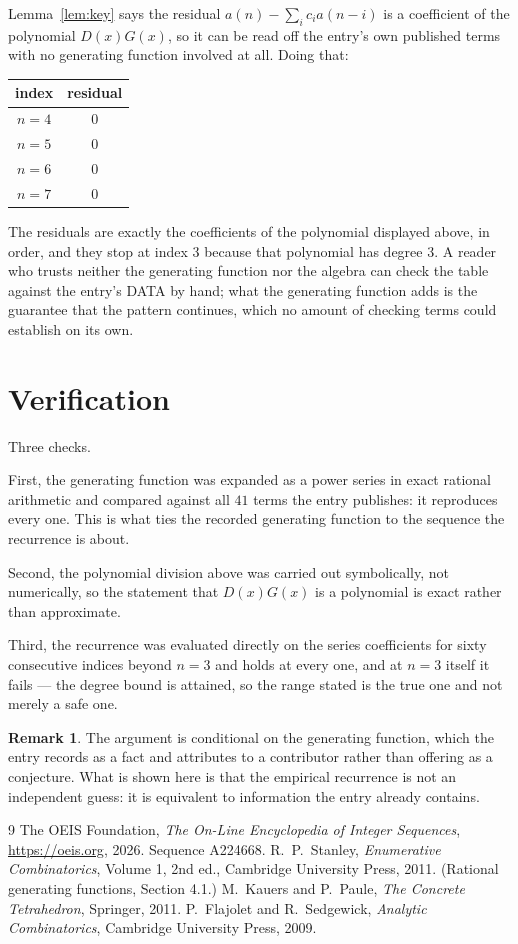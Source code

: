 \documentclass[11pt,a4paper]{article}
\theoremstyle{plain}
\theoremstyle{definition}
\newtheorem{remark}[theorem]{Remark}
\begin{document}
Lemma~\ref{lem:key} says the residual $a(n)-\sum_ic_ia(n-i)$ is a coefficient of the
polynomial $D(x)G(x)$, so it can be read off the entry's own published terms with no
generating function involved at all. Doing that:
\begin{center}
\begin{tabular}{cc}
index & residual \\ \hline
$n=4$ & $0$ \\
$n=5$ & $0$ \\
$n=6$ & $0$ \\
$n=7$ & $0$
\end{tabular}
\end{center}
The residuals are exactly the coefficients of the polynomial displayed above, in order, and
they stop at index $3$ because that polynomial has degree $3$. A reader who trusts
neither the generating function nor the algebra can check the table against the entry's DATA
by hand; what the generating function adds is the guarantee that the pattern continues, which
no amount of checking terms could establish on its own.

\section{Verification}

Three checks.

First, the generating function was expanded as a power series in exact rational arithmetic and
compared against all $41$ terms the entry publishes: it reproduces every one. This is
what ties the recorded generating function to the sequence the recurrence is about.

Second, the polynomial division above was carried out symbolically, not numerically, so the
statement that $D(x)G(x)$ is a polynomial is exact rather than approximate.

Third, the recurrence was evaluated directly on the series coefficients for sixty consecutive
indices beyond $n=3$ and holds at every one, and at $n=3$ itself it fails --- the
degree bound is attained, so the range stated is the true one and not merely a safe one.

\begin{remark}
The argument is conditional on the generating function, which the entry records as a fact and
attributes to a contributor rather than offering as a conjecture. What is shown here is that
the empirical recurrence is not an independent guess: it is equivalent to information the
entry already contains.
\end{remark}

\begin{thebibliography}{9}
 The OEIS Foundation, \emph{The On-Line Encyclopedia of Integer
Sequences}, \url{https://oeis.org}, 2026. Sequence A224668.
 R.~P.~Stanley, \emph{Enumerative Combinatorics}, Volume 1, 2nd ed.,
Cambridge University Press, 2011. (Rational generating functions, Section 4.1.)
 M.~Kauers and P.~Paule, \emph{The Concrete Tetrahedron}, Springer, 2011.
 P.~Flajolet and R.~Sedgewick, \emph{Analytic Combinatorics}, Cambridge
University Press, 2009.
\end{thebibliography}
\end{document}
